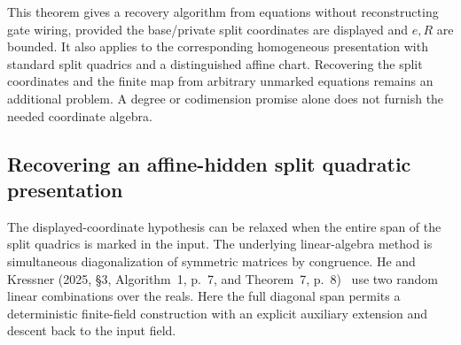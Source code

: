 This theorem gives a recovery algorithm from equations without reconstructing gate wiring, provided the base/private split coordinates are displayed and $e,R$ are bounded. It also applies to the corresponding homogeneous presentation with standard split quadrics and a distinguished affine chart. Recovering the split coordinates and the finite map from arbitrary unmarked equations remains an additional problem. A degree or codimension promise alone does not furnish the needed coordinate algebra.

\subsection{Recovering an affine-hidden split quadratic presentation}
The displayed-coordinate hypothesis can be relaxed when the entire span of the split quadrics is marked in the input. The underlying linear-algebra method is simultaneous diagonalization of symmetric matrices by congruence. He and Kressner (2025, \S3, Algorithm~1, p.~7, and Theorem~7, p.~8)~\cite{st-he-kressner} use two random linear combinations over the reals. Here the full diagonal span permits a deterministic finite-field construction with an explicit auxiliary extension and descent back to the input field.

